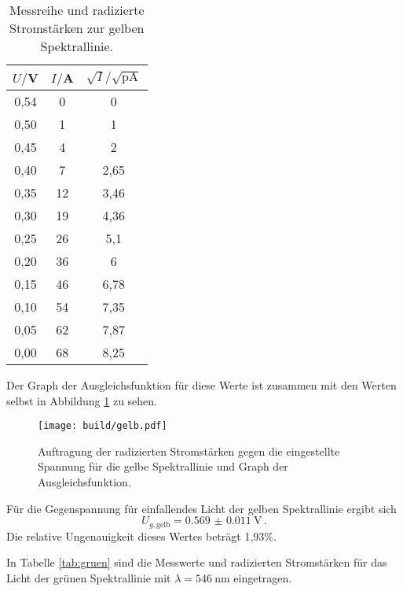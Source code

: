 \begin{table}[htp]
        \begin{center}
          \caption{Messreihe und radizierte Stromstärken zur gelben Spektrallinie.}
          \label{tab:gelb}
                \begin{tabular}{ScS}
                \toprule
                        {$U/$V} & {$I/$A} & {$\sqrt{I}/\mathrm{\sqrt{pA}}$}\\
                        ,54 &  0 & 0\\
                        0,50 &  1 & 1\\
                        0,45 &  4 & 2\\
                        0,40 &  7 & 2,65\\
                        0,35 & 12 & 3,46\\
                        0,30 & 19 & 4,36\\
                        0,25 & 26 & 5,1\\
                        0,20 & 36 & 6\\
                        0,15 & 46 & 6,78\\
                        0,10 & 54 & 7,35\\
                        0,05 & 62 & 7,87\\
                        0,00 & 68 & 8,25\\
                \bottomrule
                \end{tabular}
        \end{center}
\end{table}

Der Graph der Ausgleichsfunktion für diese Werte ist zusammen mit den Werten selbst
in Abbildung \ref{fig:gelb} zu sehen.

\begin{figure}
  \centering
  \texttt{[image: build/gelb.pdf]}
  \caption{Auftragung der radizierten Stromstärken gegen die eingestellte Spannung für die gelbe Spektrallinie und Graph der Ausgleichsfunktion.}
  \label{fig:gelb}
\end{figure}

Für die Gegenspannung für einfallendes Licht der gelben Spektrallinie ergibt sich
\begin{equation*}
  U_{g,\text{gelb}} = \SI{0.569(0011)}{\volt}\,.
\end{equation*}
Die relative Ungenauigkeit dieses Wertes beträgt 1,93\%.

In Tabelle \ref{tab:gruen} sind die Messwerte und radizierten Stromstärken
für das Licht der grünen Spektrallinie mit $\lambda = \SI{546}{\nano\meter}$
eingetragen.

